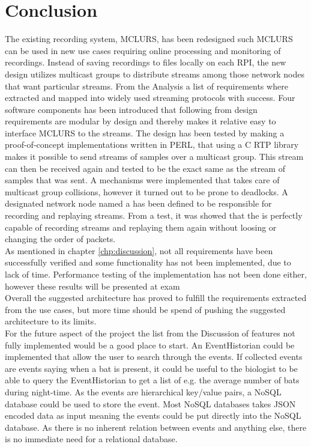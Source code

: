 \chapter{Conclusion}
The existing recording system, MCLURS, has been redesigned such MCLURS can be used in new use cases requiring online processing and monitoring of recordings. Instead of saving recordings to files locally on each RPI, the new design utilizes multicast groups to distribute streams among those network nodes that want particular streams. From the Analysis a list of requirements where extracted and mapped into widely used streaming protocols with success. Four software components has been introduced that following from design requirements are modular by design and thereby makes it relative easy to interface MCLURS to the streams. The design has been tested by making a proof-of-concept implementations written in PERL, that using a C RTP library makes it possible to send streams of samples over a multicast group. This stream can then be received again and tested to be the exact same as the stream of samples that was sent. A mechanisms were implemented that takes care of multicast group collisions, however it turned out to be prone to deadlocks. A designated network node named a \hist{} has been defined to be responsible for recording and replaying streams. From a test, it was showed that the \hist{} is perfectly capable of recording streams and replaying them again without loosing or changing the order of packets. \\

\noindent{}As mentioned in chapter \ref{chp:discussion}, not all requirements have been successfully verified and some functionality has not been implemented, due to lack of time. Performance testing of the implementation has not been done either, however these results will be presented at exam\\

\noindent{} Overall the suggested architecture has proved to fulfill the requirements extracted from the use cases, but more time should be spend of pushing the suggested architecture to its limits.\\

\noindent{}For the future aspect of the project the list from the Discussion of features not fully implemented would be a good place to start. An EventHistorian could be implemented that allow the user to search through the events. If collected events are events saying when a bat is present, it could be useful to the biologist to be able to query the EventHistorian to get a list of e.g. the average number of bats during night-time. As the events are hierarchical key/value pairs, a NoSQL database could be used to store the event. Most NoSQL databases takes JSON encoded data as input meaning the events could be put directly into the NoSQL database. As  there is no inherent relation between events and anything else, there is no immediate need for a relational database.

